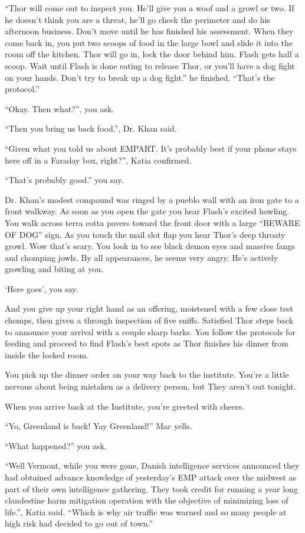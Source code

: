 \documentclass[17pt, twoside, a5paper, openright, extrafontsizes]{memoir}
\begin{document}
``Thor will come out to inspect you. He'll give you a woof and a growl
or two. If he doesn't think you are a threat, he'll go check the
perimeter and do his afternoon business. Don't move until he has
finished his assessment. When they come back in, you put two scoops of
food in the large bowl and slide it into the room off the kitchen. Thor
will go in, lock the door behind him. Flash gets half a scoop. Wait
until Flash is done eating to release Thor, or you'll have a dog fight
on your hands. Don't try to break up a dog fight.'' he finished.
``That's the protocol.''

``Okay. Then what?'', you ask.

``Then you bring us back food.'', Dr. Khan said.

``Given what you told us about EMPART. It's probably best if your phone
stays here off in a Faraday box, right?'', Katia confirmed.

``That's probably good.'' you say.

Dr. Khan's modest compound was ringed by a pueblo wall with an iron gate
to a front walkway. As soon as you open the gate you hear Flash's
excited howling. You walk across terra cotta pavers toward the front
door with a large ``BEWARE OF DOG'' sign. As you touch the mail slot
flap you hear Thor's deep throaty growl. Wow that's scary. You look in
to see black demon eyes and massive fangs and chomping jowls. By all
appearances, he seems very angry. He's actively growling and biting at
you.

`Here goes', you say.

And you give up your right hand as an offering, moistened with a few
close test chomps, then given a through inspection of five sniffs.
Satisfied Thor steps back to announce your arrival with a couple sharp
barks. You follow the protocols for feeding and proceed to find Flash's
best spots as Thor finishes his dinner from inside the locked room.

You pick up the dinner order on your way back to the institute. You're a
little nervous about being mistaken as a delivery person, but They
aren't out tonight.

When you arrive back at the Institute, you're greeted with cheers.

``Yo, Greenland is back! Yay Greenland!'' Mac yells.

``What happened?'' you ask.

``Well Vermont, while you were gone, Danish intelligence services
announced they had obtained advance knowledge of yesterday's EMP attack
over the midwest as part of their own intelligence gathering. They took
credit for running a year long clandestine harm mitigation operation
with the objective of minimizing loss of life.'', Katia said. ``Which is
why air traffic was warned and so many people at high risk had decided
to go out of town.''
\end{document}

